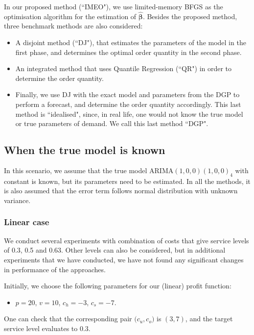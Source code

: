 \documentclass[a4paper,11pt]{article}
\begin{document}
In our proposed method (``IMEO"), we use limited-memory BFGS \cite{LN89} as the optimisation algorithm for the estimation of $\hat{\boldsymbol{\beta}}$. Besides the proposed method, three benchmark methods are also considered:
\begin{itemize}
    \item A disjoint method (``DJ"), that estimates the parameters of the model in the first phase, and determines the optimal order quantity in the second phase.
    \item An integrated method that uses Quantile Regression (``QR") in order to determine the order quantity.
    \item Finally, we use DJ with the exact model and parameters from the DGP to perform a forecast, and determine the order quantity accordingly. This last method is ``idealised", since, in real life, one would not know the true model or true parameters of demand. We call this last method ``DGP".
\end{itemize}


\subsection{When the true model is known}
In this scenario, we assume that the true model ARIMA$(1,0,0)(1,0,0)_4$ with constant is known, but its parameters need to be estimated. In all the methods, it is also assumed that the error term follows normal distribution with unknown variance.

\subsubsection{Linear case} \label{sub:exp1}

We conduct several experiments with combination of costs that give service levels of 0.3, 0.5 and 0.63. Other levels can also be considered, but in additional experiments that we have conducted, we have not found any significant changes in performance of the approaches.

Initially, we choose the following parameters for our (linear) profit function:
\begin{itemize}
    \item $p=20$, $v=10$, $c_h=-3$, $c_s=-7$.
\end{itemize}
One can check that the corresponding pair $\big( c_u,c_o \big)$ is $(3,7)$, and the target service level evaluates to $0.3$.
\end{document}
